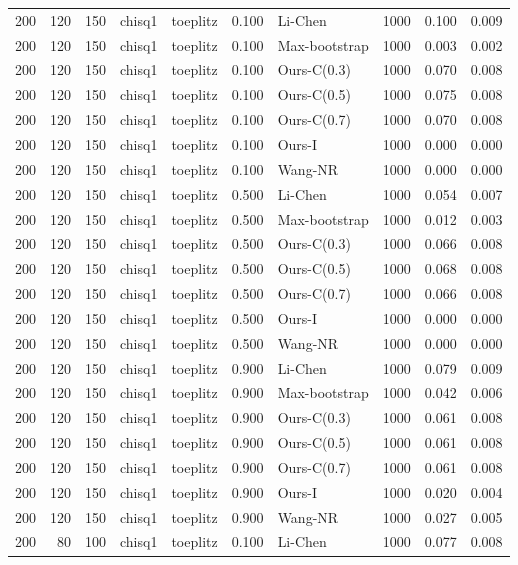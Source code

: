 \begin{tabular}{rrrllrlrrr}
200 & 120 & 150 & chisq1 & toeplitz & 0.100 & Li-Chen & 1000 & 0.100 & 0.009 \\
200 & 120 & 150 & chisq1 & toeplitz & 0.100 & Max-bootstrap & 1000 & 0.003 & 0.002 \\
200 & 120 & 150 & chisq1 & toeplitz & 0.100 & Ours-C(0.3) & 1000 & 0.070 & 0.008 \\
200 & 120 & 150 & chisq1 & toeplitz & 0.100 & Ours-C(0.5) & 1000 & 0.075 & 0.008 \\
200 & 120 & 150 & chisq1 & toeplitz & 0.100 & Ours-C(0.7) & 1000 & 0.070 & 0.008 \\
200 & 120 & 150 & chisq1 & toeplitz & 0.100 & Ours-I & 1000 & 0.000 & 0.000 \\
200 & 120 & 150 & chisq1 & toeplitz & 0.100 & Wang-NR & 1000 & 0.000 & 0.000 \\
200 & 120 & 150 & chisq1 & toeplitz & 0.500 & Li-Chen & 1000 & 0.054 & 0.007 \\
200 & 120 & 150 & chisq1 & toeplitz & 0.500 & Max-bootstrap & 1000 & 0.012 & 0.003 \\
200 & 120 & 150 & chisq1 & toeplitz & 0.500 & Ours-C(0.3) & 1000 & 0.066 & 0.008 \\
200 & 120 & 150 & chisq1 & toeplitz & 0.500 & Ours-C(0.5) & 1000 & 0.068 & 0.008 \\
200 & 120 & 150 & chisq1 & toeplitz & 0.500 & Ours-C(0.7) & 1000 & 0.066 & 0.008 \\
200 & 120 & 150 & chisq1 & toeplitz & 0.500 & Ours-I & 1000 & 0.000 & 0.000 \\
200 & 120 & 150 & chisq1 & toeplitz & 0.500 & Wang-NR & 1000 & 0.000 & 0.000 \\
200 & 120 & 150 & chisq1 & toeplitz & 0.900 & Li-Chen & 1000 & 0.079 & 0.009 \\
200 & 120 & 150 & chisq1 & toeplitz & 0.900 & Max-bootstrap & 1000 & 0.042 & 0.006 \\
200 & 120 & 150 & chisq1 & toeplitz & 0.900 & Ours-C(0.3) & 1000 & 0.061 & 0.008 \\
200 & 120 & 150 & chisq1 & toeplitz & 0.900 & Ours-C(0.5) & 1000 & 0.061 & 0.008 \\
200 & 120 & 150 & chisq1 & toeplitz & 0.900 & Ours-C(0.7) & 1000 & 0.061 & 0.008 \\
200 & 120 & 150 & chisq1 & toeplitz & 0.900 & Ours-I & 1000 & 0.020 & 0.004 \\
200 & 120 & 150 & chisq1 & toeplitz & 0.900 & Wang-NR & 1000 & 0.027 & 0.005 \\
200 & 80 & 100 & chisq1 & toeplitz & 0.100 & Li-Chen & 1000 & 0.077 & 0.008 \\

\end{tabular}
